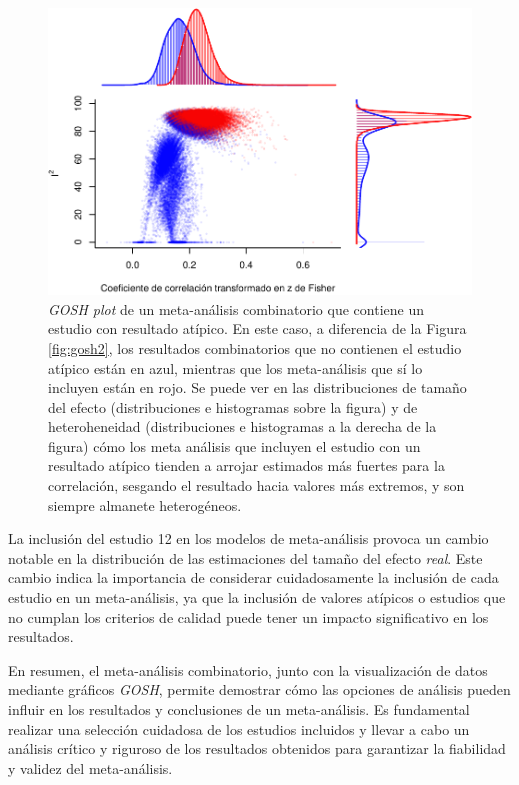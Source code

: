 \documentclass[
  bookmarksnumbered]{article}
\begin{document}
\begin{figure}
\centering
\includegraphics{Meta-analysis_files/figure-latex/gosh3-1.pdf}
\caption{\label{fig:gosh3}\emph{GOSH plot} de un meta-análisis combinatorio que contiene un estudio con resultado atípico. En este caso, a diferencia de la Figura \ref{fig:gosh2}, los resultados combinatorios que no contienen el estudio atípico están en azul, mientras que los meta-análisis que sí lo incluyen están en rojo. Se puede ver en las distribuciones de tamaño del efecto (distribuciones e histogramas sobre la figura) y de heteroheneidad (distribuciones e histogramas a la derecha de la figura) cómo los meta análisis que incluyen el estudio con un resultado atípico tienden a arrojar estimados más fuertes para la correlación, sesgando el resultado hacia valores más extremos, y son siempre almanete heterogéneos.}
\end{figure}

La inclusión del estudio 12 en los modelos de meta-análisis provoca un cambio notable en la distribución de las estimaciones del tamaño del efecto \emph{real}. Este cambio indica la importancia de considerar cuidadosamente la inclusión de cada estudio en un meta-análisis, ya que la inclusión de valores atípicos o estudios que no cumplan los criterios de calidad puede tener un impacto significativo en los resultados.

En resumen, el meta-análisis combinatorio, junto con la visualización de datos mediante gráficos \emph{GOSH}, permite demostrar cómo las opciones de análisis pueden influir en los resultados y conclusiones de un meta-análisis. Es fundamental realizar una selección cuidadosa de los estudios incluidos y llevar a cabo un análisis crítico y riguroso de los resultados obtenidos para garantizar la fiabilidad y validez del meta-análisis.
\end{document}
